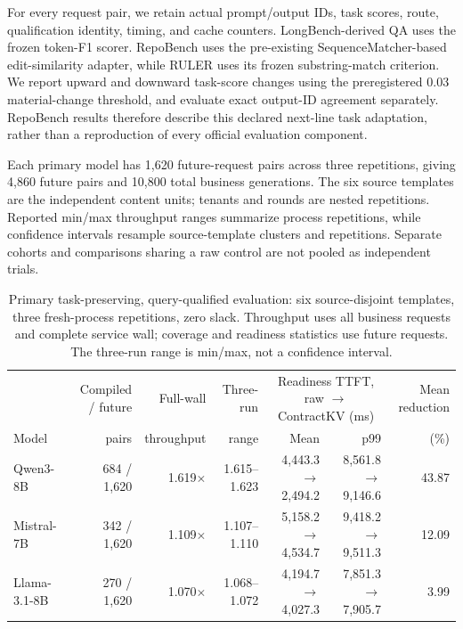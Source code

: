 For every request pair, we retain actual prompt/output IDs, task scores, route, qualification identity, timing, and cache counters. LongBench-derived QA uses the frozen token-F1 scorer. RepoBench uses the pre-existing SequenceMatcher-based edit-similarity adapter, while RULER uses its frozen substring-match criterion. We report upward and downward task-score changes using the preregistered 0.03 material-change threshold, and evaluate exact output-ID agreement separately. RepoBench results therefore describe this declared next-line task adaptation, rather than a reproduction of every official evaluation component.

Each primary model has 1,620 future-request pairs across three repetitions, giving 4,860 future pairs and 10,800 total business generations. The six source templates are the independent content units; tenants and rounds are nested repetitions. Reported min/max throughput ranges summarize process repetitions, while confidence intervals resample source-template clusters and repetitions. Separate cohorts and comparisons sharing a raw control are not pooled as independent trials.

\begin{table}[t]
\centering\small
\caption{Primary task-preserving, query-qualified evaluation: six source-disjoint templates, three fresh-process repetitions, zero slack. Throughput uses all business requests and complete service wall; coverage and readiness statistics use future requests. The three-run range is min/max, not a confidence interval.}
\label{tab:primary}
\begin{tabular}{@{}lrrrrrr@{}}
\toprule
& Compiled / future & Full-wall & Three-run & \multicolumn{2}{c}{Readiness TTFT, raw $\rightarrow$ ContractKV (ms)} & Mean reduction\\
Model & pairs & throughput & range & Mean & p99 & (\%)\\
\midrule
Qwen3-8B & 684 / 1,620 & 1.619$\times$ & 1.615--1.623 & 4,443.3 $\rightarrow$ 2,494.2 & 8,561.8 $\rightarrow$ 9,146.6 & 43.87\\
Mistral-7B & 342 / 1,620 & 1.109$\times$ & 1.107--1.110 & 5,158.2 $\rightarrow$ 4,534.7 & 9,418.2 $\rightarrow$ 9,511.3 & 12.09\\
Llama-3.1-8B & 270 / 1,620 & 1.070$\times$ & 1.068--1.072 & 4,194.7 $\rightarrow$ 4,027.3 & 7,851.3 $\rightarrow$ 7,905.7 & 3.99\\
\bottomrule
\end{tabular}
\end{table}

